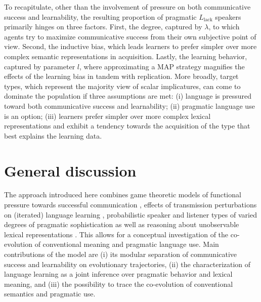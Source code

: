 \documentclass[a4paper, 11pt]{article}
\theoremstyle{Satz}
\newcommand{\mylang}[1]{\ensuremath{L_{\text{#1}}}\xspace} %
\newcommand{\Llack}{\mylang{lack}}
\begin{document}
To recapitulate, other than the involvement of pressure on both communicative success and learnability,
the resulting proportion of pragmatic $\Llack$ speakers primarily hinges on three
factors. First, the degree, captured by $\lambda$, to which agents try to maximize
communicative success from their own subjective point of view. Second, the inductive bias,
which leads learners to prefer simpler over more complex semantic representations in
acquisition. Lastly, the learning behavior, captured by parameter $l$, where approximating a
MAP strategy magnifies the effects of the learning bias in tandem with replication. More broadly,
target types, which represent the majority view of scalar implicatures, can come to
dominate the population if three assumptions are met: (i) language is pressured toward both
communicative success and learnability; (ii) pragmatic language use is an option; (iii) learners prefer
simpler over more complex lexical representations and exhibit a tendency towards the
acquisition of the type that best explains the learning data.


\section{General discussion}\label{sec:discussion}

The approach introduced here combines game theoretic models of functional pressure towards
successful communication \citep{nowak+krakauer:1999}, effects of transmission perturbations on
(iterated) language learning \citep{griffiths+kalish:2007}, probabilistic speaker and listener
types of varied degrees of pragmatic sophistication \citep{frank+goodman:2012,
  franke+jaeger:2014} as well as reasoning about unobservable lexical representations
\citep{bergen+etal:2012,bergen+etal:2016}. This allows for a conceptual investigation of the
co-evolution of conventional meaning and pragmatic language use. Main contributions of the
model are (i) its modular separation of communicative success and learnability on evolutionary
trajectories, (ii) the characterization of language learning as a joint inference over
pragmatic behavior and lexical meaning, and (iii) the possibility to trace the co-evolution of
conventional semantics and pragmatic use.
\end{document}

